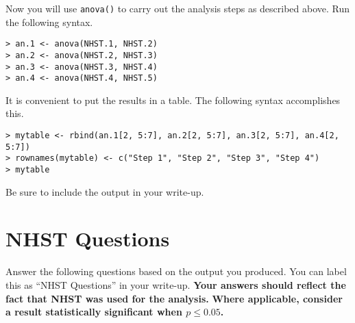 \documentclass[]{article}
\begin{document}
\pagebreak
\noindent Now you will use \texttt{anova()} to carry out the analysis steps as described above. Run the following syntax.

\begin{shaded}
\begin{lstlisting}
> an.1 <- anova(NHST.1, NHST.2)
> an.2 <- anova(NHST.2, NHST.3)
> an.3 <- anova(NHST.3, NHST.4)
> an.4 <- anova(NHST.4, NHST.5)
\end{lstlisting}
\end{shaded}

\noindent It is convenient to put the results in a table. The following syntax accomplishes this.

\begin{shaded}
\begin{lstlisting}
> mytable <- rbind(an.1[2, 5:7], an.2[2, 5:7], an.3[2, 5:7], an.4[2, 5:7])
> rownames(mytable) <- c("Step 1", "Step 2", "Step 3", "Step 4")
> mytable
\end{lstlisting}
\end{shaded}

\noindent Be sure to include the output in your write-up.

%
%

\section*{NHST Questions}

\noindent Answer the following questions based on the output you produced. You can label this as ``NHST Questions'' in your write-up. \textbf{Your answers should reflect the fact that NHST was used for the analysis.} \textbf{Where applicable, consider a result statistically significant when $p \leq 0.05$.}
\end{document}
